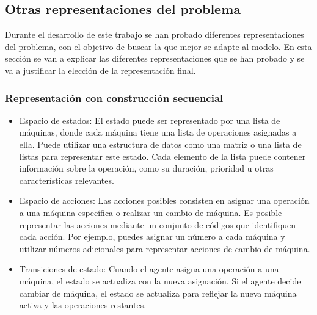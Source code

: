 \subsection{Otras representaciones del problema}
Durante el desarrollo de este trabajo se han probado diferentes representaciones
del problema, con el objetivo de buscar la que mejor se adapte al modelo. En
esta sección se van a explicar las diferentes representaciones que se han probado
y se va a justificar la elección de la representación final.\medskip

\subsubsection{Representación con construcción secuencial}
\begin{itemize}
    \item Espacio de estados: El estado puede ser representado por una 
    lista de máquinas, donde cada máquina tiene una lista de operaciones asignadas
    a ella. Puede utilizar una estructura de datos como una matriz o una lista de
    listas para representar este estado. Cada elemento de la lista puede contener 
    información sobre la operación, como su duración, prioridad u otras características 
    relevantes.
    \item Espacio de acciones: Las acciones posibles consisten en asignar una operación 
    a una máquina específica o realizar un cambio de máquina. Es posible representar las acciones 
    mediante un conjunto de códigos que identifiquen cada acción. Por ejemplo, puedes asignar 
    un número a cada máquina y utilizar números adicionales para representar acciones 
    de cambio de máquina.
    \item Transiciones de estado: Cuando el agente asigna una operación a una máquina, 
    el estado se actualiza con la nueva asignación. Si el agente decide cambiar de máquina, 
    el estado se actualiza para reflejar la nueva máquina activa y las operaciones restantes.
\end{itemize}

